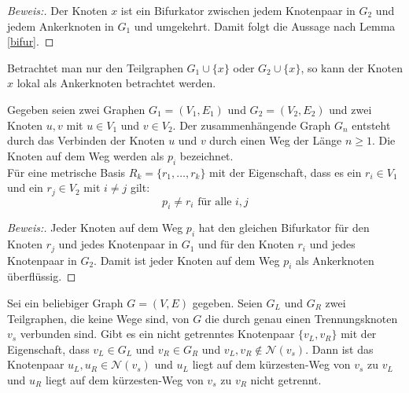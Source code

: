 \begin{proof}[Beweis:]
Der Knoten $x$ ist ein Bifurkator zwischen jedem Knotenpaar in $G_2$ und jedem Ankerknoten in $G_1$ und umgekehrt. Damit folgt die Aussage nach Lemma \ref{bifur}.
\end{proof}
Betrachtet man nur den Teilgraphen $G_1 \cup \{x\}$ oder $G_2 \cup \{x\}$, so kann der Knoten $x$ lokal als Ankerknoten betrachtet werden. 
\begin{lem}
\label{keinknotenvonwegindermd}
Gegeben seien zwei Graphen $G_1=(V_1,E_1)$ und $G_2=(V_2,E_2)$ und zwei Knoten $u,v$ mit $u \in V_1$ und $v \in V_2$.
Der zusammenhängende Graph $G_n$ entsteht durch das Verbinden der Knoten $u$ und $v$ durch einen Weg der Länge $n \geq 1$. Die Knoten auf dem Weg werden als $p_i$ bezeichnet.\\
Für eine metrische Basis $R_k= \{ r_1, \ldots , r_k \}$ mit der Eigenschaft, dass es ein $r_i \in V_1$ und ein $r_j \in V_2$  mit $i \neq j$ gilt:
\[p_i \neq r_i \text{ für alle } i,j\]
\end{lem}
\begin{proof}[Beweis:]
Jeder Knoten auf dem Weg $p_i$ hat den gleichen Bifurkator für den Knoten $r_j$ und jedes Knotenpaar in $G_1$ und für den Knoten $r_i$ und jedes Knotenpaar in $G_2$. Damit ist jeder Knoten auf dem Weg $p_i$ als Ankerknoten überflüssig.
\end{proof}
\begin{lem}
\label{nachbartrennungsknoten}
Sei ein beliebiger Graph $G=(V,E)$ gegeben. Seien $G_L$ und $G_R$ zwei Teilgraphen, die keine Wege sind, von $G$ die durch genau einen Trennungsknoten $v_s$ verbunden sind. Gibt es ein nicht getrenntes Knotenpaar $\{v_L,v_R\}$ mit der Eigenschaft, dass $v_L\in G_L$ und $v_R \in G_R$ und $v_L, v_R \notin \mathcal{N}(v_s)$.\newline
Dann ist das Knotenpaar $u_L,u_R \in \mathcal{N}(v_s)$ und $u_L$ liegt auf dem kürzesten-Weg von $v_s$ zu $v_L$ und $u_R$ liegt auf dem kürzesten-Weg von $v_s$ zu $v_R$ nicht getrennt.
\end{lem}
